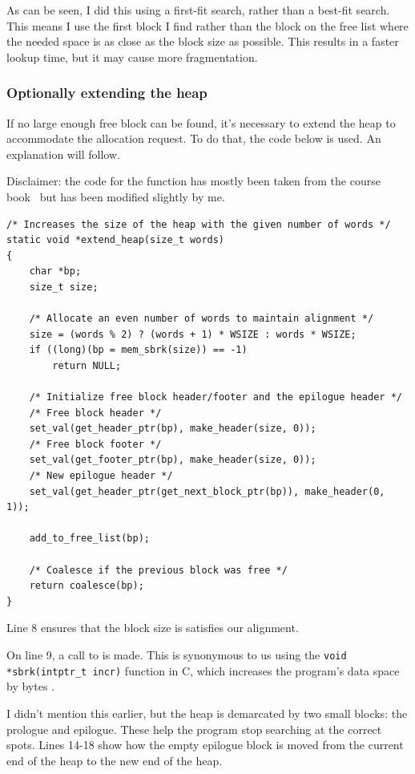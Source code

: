 As can be seen, I did this using a first-fit search, rather than a best-fit search. This means I use the first block I find rather than the block on the free list where the needed space is as close as the block size as possible. This results in a faster lookup time, but it may cause more fragmentation.

\subsubsection{Optionally extending the heap}
\label{sec:extend-heap}

If no large enough free block can be found, it's necessary to extend the heap to accommodate the allocation request. To do that, the code below is used. An explanation will follow.

Disclaimer: the code for the  function has mostly been taken from the course book~\cite[p. 894]{computersystems} but has been modified slightly by me.

\bgroup
\small
\begin{verbatim}
/* Increases the size of the heap with the given number of words */
static void *extend_heap(size_t words)
{
    char *bp;
    size_t size;

    /* Allocate an even number of words to maintain alignment */
    size = (words % 2) ? (words + 1) * WSIZE : words * WSIZE;
    if ((long)(bp = mem_sbrk(size)) == -1)
        return NULL;

    /* Initialize free block header/footer and the epilogue header */
    /* Free block header */
    set_val(get_header_ptr(bp), make_header(size, 0));
    /* Free block footer */
    set_val(get_footer_ptr(bp), make_header(size, 0));
    /* New epilogue header */
    set_val(get_header_ptr(get_next_block_ptr(bp)), make_header(0, 1)); 

    add_to_free_list(bp);

    /* Coalesce if the previous block was free */
    return coalesce(bp);
}
\end{verbatim}
\egroup

Line 8 ensures that the block size is satisfies our alignment.

On line 9, a call to  is made. This is synonymous to us using the \texttt{void *sbrk(intptr\_t incr)} function in C, which increases the program's data space by  bytes \cite{sbrkmanpage}.

I didn't mention this earlier, but the heap is demarcated by two small blocks: the prologue and epilogue. These help the program stop searching at the correct spots. Lines 14-18 show how the empty epilogue block is moved from the current end of the heap to the new end of the heap.

